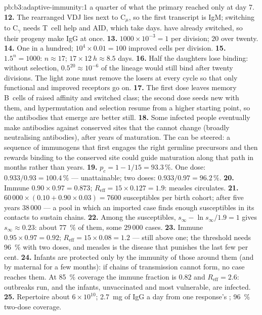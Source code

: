 \begin{solution}{pb:b3:adaptive-immunity:1}
a quarter of what the primary reached only at day 7.
\textbf{12.} The rearranged VDJ lies next to C$_{\mu}$, so the first
transcript is IgM; switching to C$_{\gamma}$ needs T~cell help and AID,
which take days.  have already switched, so their progeny
make IgG at once.
\textbf{13.} $1000\times 10^{-3} = 1$ per division; $20$ over twenty.
\textbf{14.} One in a hundred; $10^{4}\times 0.01 = 100$ improved cells
per division.
\textbf{15.} $1.5^{n} = 1000$: $n \approx 17$; $17\times \qty{12}{h}
\approx 8.5$ days.
\textbf{16.} Half the daughters lose binding: without selection, $0.5^{20}
\approx 10^{-6}$ of the lineage would still bind after twenty
divisions. The light zone must remove the losers at every cycle so that
only functional and improved receptors go on.
\textbf{17.} The first dose leaves memory B~cells of raised affinity and
switched class; the second dose seeds new  with them,
and hypermutation and selection resume from a higher starting point,
so the antibodies that emerge are better still.
\textbf{18.} Some infected people eventually make antibodies against
conserved sites that the  cannot change (broadly neutralising
antibodies), after years of maturation. The  can be
steered: a sequence of immunogens that first engages the right germline
precursors and then rewards binding to the conserved site could guide
maturation along that path in months rather than years.
\textbf{19.} $p_{c} = 1 - 1/15 = 93.3\,\%$. One dose: $0.933/0.93 =
100.4\,\%$ --- unattainable; two doses: $0.933/0.97 = 96.2\,\%$.
\textbf{20.} Immune $0.90\times 0.97 = 0.873$; $R_{\text{eff}} = 15\times
0.127 = 1.9$: measles circulates.
\textbf{21.} $60\,000\times (0.10 + 0.90\times 0.03) = 7600$ susceptibles
per birth cohort; after five years $38\,000$ --- a pool in which an
imported case finds enough susceptibles in its contacts to sustain
chains.
\textbf{22.} Among the susceptibles, $s_{\infty} - \ln s_{\infty}/1.9 =
1$ gives $s_{\infty} \approx 0.23$: about \qty{77}{\%} of them, some
$29\,000$ cases.
\textbf{23.} Immune $0.95\times 0.97 = 0.92$; $R_{\text{eff}} = 15\times
0.08 = 1.2$ --- still above one; the threshold needs \qty{96}{\%} with
two doses, and measles is the disease that punishes the last few per
cent.
\textbf{24.} Infants are protected only by the immunity of those around
them (and by maternal  for a few months): if chains of
transmission cannot form, no case reaches them. At \qty{85}{\%} coverage
the immune fraction is $0.82$ and $R_{\text{eff}} = 2.6$: outbreaks
run, and the infants, unvaccinated and most vulnerable, are infected.
\textbf{25.} Repertoire about $6\times 10^{10}$; \qty{2.7}{mg} of IgG a
day from one response's ; \qty{96}{\%} two-dose coverage.
\end{solution}
